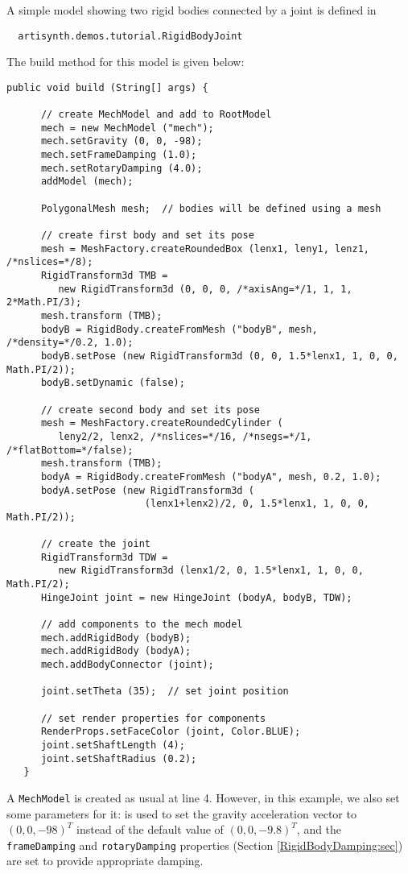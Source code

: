 A simple model showing two rigid bodies connected by
a joint is defined in
%
\begin{verbatim}
  artisynth.demos.tutorial.RigidBodyJoint
\end{verbatim}
%

The build method for this model is given below:
\lstset{numbers=left}
\begin{lstlisting}[]
   public void build (String[] args) {

      // create MechModel and add to RootModel
      mech = new MechModel ("mech");
      mech.setGravity (0, 0, -98);
      mech.setFrameDamping (1.0);
      mech.setRotaryDamping (4.0);
      addModel (mech);

      PolygonalMesh mesh;  // bodies will be defined using a mesh

      // create first body and set its pose
      mesh = MeshFactory.createRoundedBox (lenx1, leny1, lenz1, /*nslices=*/8);
      RigidTransform3d TMB = 
         new RigidTransform3d (0, 0, 0, /*axisAng=*/1, 1, 1, 2*Math.PI/3);
      mesh.transform (TMB);
      bodyB = RigidBody.createFromMesh ("bodyB", mesh, /*density=*/0.2, 1.0);
      bodyB.setPose (new RigidTransform3d (0, 0, 1.5*lenx1, 1, 0, 0, Math.PI/2));
      bodyB.setDynamic (false);

      // create second body and set its pose
      mesh = MeshFactory.createRoundedCylinder (
         leny2/2, lenx2, /*nslices=*/16, /*nsegs=*/1, /*flatBottom=*/false);
      mesh.transform (TMB);
      bodyA = RigidBody.createFromMesh ("bodyA", mesh, 0.2, 1.0);
      bodyA.setPose (new RigidTransform3d (
                        (lenx1+lenx2)/2, 0, 1.5*lenx1, 1, 0, 0, Math.PI/2));

      // create the joint      
      RigidTransform3d TDW = 
         new RigidTransform3d (lenx1/2, 0, 1.5*lenx1, 1, 0, 0, Math.PI/2);
      HingeJoint joint = new HingeJoint (bodyA, bodyB, TDW);

      // add components to the mech model
      mech.addRigidBody (bodyB);
      mech.addRigidBody (bodyA);
      mech.addBodyConnector (joint);

      joint.setTheta (35);  // set joint position

      // set render properties for components
      RenderProps.setFaceColor (joint, Color.BLUE);
      joint.setShaftLength (4);
      joint.setShaftRadius (0.2);
   }
\end{lstlisting}
\lstset{numbers=none}

A {\tt MechModel} is created as usual at line 4. However, in this
example, we also set some parameters for it:
 is
used to set the gravity acceleration vector to $(0, 0, -98)^T$ instead
of the default value of $(0, 0, -9.8)^T$, and the {\tt frameDamping}
and {\tt rotaryDamping} properties (Section
\ref{RigidBodyDamping:sec}) are set to provide appropriate damping.

